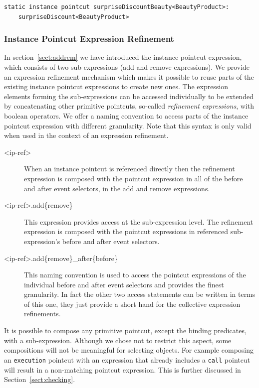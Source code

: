 \documentclass{acm_proc_article-sp}
\newcommand{\lstinln}[1]{\lstinline~#1~}
\begin{document}
\begin{lstlisting}[float=h!, caption={A type refined pointcut},label={lst:typeref}]
static instance pointcut surpriseDiscountBeauty<BeautyProduct>: 
	surpriseDiscount<BeautyProduct>
\end{lstlisting}

\subsubsection{Instance Pointcut Expression Refinement}
In section~\ref{sect:addrem} we have introduced the instance pointcut expression, which consists of two sub-expressions (add and remove expressions). 
We provide an expression refinement mechanism which makes it possible to reuse parts of the existing instance pointcut expressions to create new ones. 
The expression elements forming the sub-expressions can be accessed individually to be extended by concatenating other primitive pointcuts, so-called \emph{refinement expressions}, with boolean operators. 
We offer a naming convention to access parts of the instance pointcut expression with different granularity. Note that this syntax is only valid when used in the context of an expression refinement. 
\begin{description}
\item[<ip-ref>]When an instance pointcut is referenced directly then the refinement expression is composed with the pointcut expression in all of the before and after event selectors, in the add and remove expressions.
\item[<ip-ref>.add\{remove\}] This expression provides access at the sub-expression level. The refinement expression is composed with the pointcut expressions in referenced sub-expression's before and after event selectors. 
\item[<ip-ref>.add\{remove\}_after\{before\}] This naming convention is used to access the pointcut expressions of the individual before and after event selectors and provides the finest granularity. In fact the other two access statements can be written in terms of this one, they just provide a short hand for the collective expression refinements. 
\end{description}

It is possible to compose any primitive pointcut, except the binding predicates, with a sub-expression. Although we chose not to restrict this aspect, some compositions will not be meaningful for selecting objects. For example composing an \lstinln{execution} pointcut with an expression that already includes a \lstinln{call} pointcut will result in a non-matching pointcut expression. This is further discussed in Section~\ref{sect:checking}.
\end{document}
